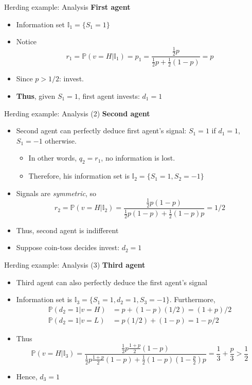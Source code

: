 \documentclass[english,10pt
,aspectratio=169
]{beamer}
\begin{document}
\begin{frame}{Herding example: Analysis}
	\textbf{First agent}
	\begin{itemize}
		\item Information set $\mathbb{I}_1=\{S_1=1\}$
		\item Notice
		\[
			r_1 = \mathbb{P}(v=H|\mathbb{I}_1) = p_1 = \frac{\frac{1}{2} p}{\frac{1}{2} p+\frac{1}{2} (1-p)} = p 
		\]
		\item Since $p>1/2$: invest.
		\item \textbf{Thus}, given $S_1=1$, first agent invests: $d_1=1$
	\end{itemize}
\end{frame}


\begin{frame}{Herding example: Analysis (2)}
	\textbf{Second agent}
	\begin{itemize}
		\item Second agent can perfectly deduce first agent's signal: $S_1=1$ if $d_1=1$, $S_1=-1$ otherwise.
		\begin{itemize}
			\item In other words, $q_2 = r_1$, no information is lost.
			\item Therefore, his information set is $\mathbb{I}_2=\{S_1=1,S_2=-1\}$
		\end{itemize}
		\item Signals are \emph{symmetric}, so
		\[ r_2 = \mathbb{P}(v=H|\mathbb{I}_2)	 = \frac{\frac{1}{2} p(1-p)}{\frac{1}{2} p(1-p)+\frac{1}{2} (1-p)p} = 1/2 \]
		\item Thus, second agent is indifferent
		\item Suppose coin-toss decides invest: $d_2=1$
	\end{itemize}
\end{frame}


\begin{frame}{Herding example: Analysis (3)}
	\textbf{Third agent}
	\begin{itemize}
		\item Third agent can also perfectly deduce the first agent's signal
		\item Information set is $\mathbb{I}_3=\{S_1=1, d_2=1, S_3=-1\}$. Furthermore,  
		\begin{align*}
		\mathbb{P}(d_2=1|v=H)	&=p +(1-p) (1/2)=(1+p)/2\\
		\mathbb{P}(d_2=1|v=L)	& =p(1/2) +(1-p)=1-p/2
		\end{align*}
		\item Thus
		\[
			\mathbb{P}(v=H|\mathbb{I}_3) 	
			 = \frac{\frac{1}{2}p \frac{1+p}{2}(1-p)}{\frac{1}{2}p\frac{1+p}{2}(1-p)+\frac{1}{2}(1-p)(1-\frac{p}{2})p} 
			=\frac{1}{3} + \frac{p}{3}>\frac{1}{2}
		\]
		\item Hence, $d_3=1$
	\end{itemize}
\end{frame}
\end{document}
